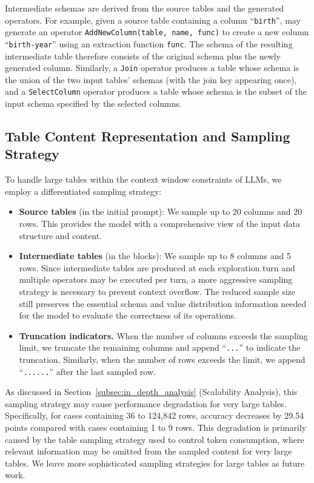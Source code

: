 Intermediate schemas are derived from the source tables and the generated operators. For example, given a source table containing a column ``\texttt{birth}'', \sys may generate an operator \texttt{AddNewColumn(table, name, func)} to create a new column ``\texttt{birth-year}'' using an extraction function \texttt{func}. The schema of the resulting intermediate table therefore consists of the original schema plus the newly generated column. Similarly, a \texttt{Join} operator produces a table whose schema is the union of the two input tables' schemas (with the join key appearing once), and a \texttt{SelectColumn} operator produces a table whose schema is the subset of the input schema specified by the selected columns.

\subsection{Table Content Representation and Sampling Strategy}
\label{subsec:appendix_table_content}

To handle large tables within the context window constraints of LLMs, we employ a differentiated sampling strategy:

\begin{itemize}[leftmargin=*]
    \item \textbf{Source tables} (in the initial prompt): We sample up to 20 columns and 20 rows. This provides the model with a comprehensive view of the input data structure and content.
    \item \textbf{Intermediate tables} (in the  blocks): We sample up to 8 columns and 5 rows. Since intermediate tables are produced at each exploration turn and multiple operators may be executed per turn, a more aggressive sampling strategy is necessary to prevent context overflow. The reduced sample size still preserves the essential schema and value distribution information needed for the model to evaluate the correctness of its operations.
    \item \textbf{Truncation indicators.} When the number of columns exceeds the sampling limit, we truncate the remaining columns and append ``\texttt{...}'' to indicate the truncation. Similarly, when the number of rows exceeds the limit, we append ``\texttt{......}'' after the last sampled row.
\end{itemize}

As discussed in Section~\ref{subsec:in_depth_analysis} (Scalability Analysis), this sampling strategy may cause performance degradation for very large tables. Specifically, for cases containing 36 to 124,842 rows, accuracy decreases by 29.54 points compared with cases containing 1 to 9 rows. This degradation is primarily caused by the table sampling strategy used to control token consumption, where relevant information may be omitted from the sampled content for very large tables. We leave more sophisticated sampling strategies for large tables as future work.

